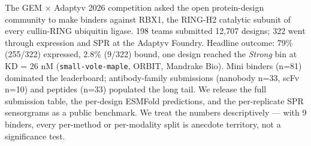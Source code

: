 The GEM × Adaptyv 2026 competition asked the open protein-design
community to make binders against RBX1, the RING-H2 catalytic subunit of
every cullin-RING ubiquitin ligase. 198 teams submitted 12,707 designs;
322 went through expression and SPR at the Adaptyv Foundry. Headline
outcome: 79\% (255/322) expressed, 2.8\% (9/322) bound, one design
reached the \emph{Strong} bin at KD = 26 nM (\texttt{small-vole-maple},
ORBIT, Mandrake Bio). Mini binders (n=81) dominated the leaderboard;
antibody-family submissions (nanobody n=33, scFv n=10) and peptides
(n=33) populated the long tail. We release the full submission table,
the per-design ESMFold predictions, and the per-replicate SPR
sensorgrams as a public benchmark. We treat the numbers descriptively
--- with 9 binders, every per-method or per-modality split is anecdote
territory, not a significance test.
